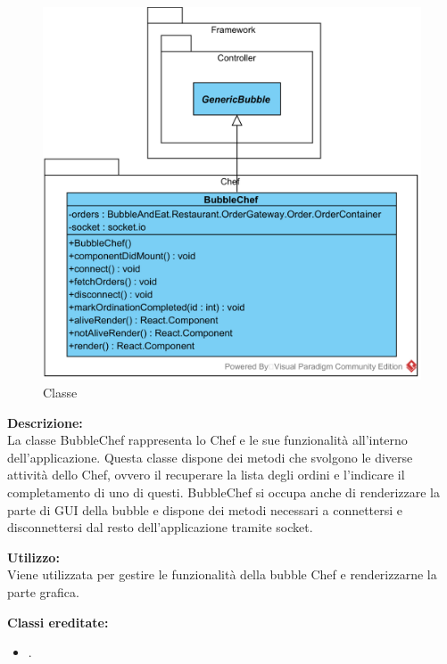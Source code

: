 \paragraph[::Restaurant::Chef::BubbleChef]{\class}\mbox{}\\ \label{\class}
\begin{figure}[H]
	\centering
	\includegraphics[width=12cm]{./diagrammi/demo/client/bubblechef.png}
	\caption{Classe \class}
\end{figure}
\textbf{Descrizione:}\\
La classe BubbleChef rappresenta lo Chef e le sue funzionalità all'interno dell'applicazione. Questa classe dispone dei metodi che svolgono le diverse attività dello Chef, ovvero il recuperare la lista degli ordini e l'indicare il completamento di uno di questi. BubbleChef si occupa anche di renderizzare la parte di GUI della bubble e dispone dei metodi necessari a connettersi e disconnettersi dal resto dell'applicazione tramite socket.

\textbf{Utilizzo:}\\
Viene utilizzata per gestire le funzionalità della bubble Chef e renderizzarne la parte grafica.

\textbf{Classi ereditate:}
\begin{itemize}
	\item {}.
\end{itemize}



